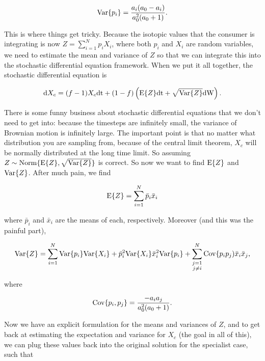 \documentclass[11pt]{article}
\begin{document}
\begin{equation}
	{\rm Var}\{p_i\} = \frac{a_i(a_0 - a_i)}{a_0^2(a_0 + 1)}.
\end{equation}

This is where things get tricky.
Because the isotopic values that the consumer is integrating is now $Z = \sum_{i=1}^Np_iX_i$, where both $p_i$ and $X_i$ are random variables, we need to estimate the mean and variance of $Z$ so that we can integrate this into the stochastic differential equation framework.
When we put it all together, the stochastic differential equation is

\begin{equation}
{\rm d}X_c = (f-1)X_c{\rm dt} + (1-f)\left({\rm E}\{Z\} {\rm dt} + \sqrt{{\rm Var}\{Z\}}{\rm dW}\right).
\end{equation}

There is some funny business about stochastic differential equations that we don't need to get into: because the timesteps are infinitely small, the variance of Brownian motion is infinitely large.
The important point is that no matter what distribution you are sampling from, because of the central limit theorem, $X_c$ will be normally distributed at the long time limit.
So assuming $Z \sim {\rm Norm}\{{\rm E}\{Z\}, \sqrt{{\rm Var}\{Z\}}\}$ is correct.
So now we want to find ${\rm E}\{Z\}$ and ${\rm Var}\{Z\}$.
After much pain, we find

\begin{equation}
	{\rm E}\{Z\} = \sum_{i=1}^N \bar{p}_i \bar{x}_i	
\end{equation}

\noindent where $\bar{p}_i$ and $\bar{x}_i$ are the means of each, respectively.
Moreover (and this was the painful part),

\begin{equation}
	{\rm Var}\{Z\} = \sum_{i=1}^N {\rm Var}\{p_i\}{\rm Var}\{X_i\} + \bar{p}_i^2{\rm Var}\{X_i\} \bar{x}_i^2 {\rm Var}\{p_i\} + \sum_{\substack{
	j=1 \\
	j \neq i}							
	}^N {\rm Cov}\{p_ip_j)\bar{x}_i\bar{x}_j,
\end{equation}

\noindent where 

\begin{equation}
	{\rm Cov}\{p_i,p_j\} = \frac{-a_ia_j}{a_0^2(a_0 + 1)}.
\end{equation}

Now we have an explicit formulation for the means and variances of $Z$, and to get back at estimating the expectation and variance for $X_c$ (the goal in all of this), we can plug these values back into the original solution for the specialist case, such that
\end{document}
